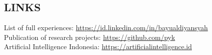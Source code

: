 \documentclass[margin, 10pt]{res} %
\begin{document}
\begin{resume}

\section{LINKS}
List of full experiences: \url{https://id.linkedin.com/in/bayualdiyansyah}\\
Publication of research projects: \url{https://github.com/pyk}\\
Artificial Intelligence Indonesia: \url{https://artificialintelligence.id}


\end{resume}
\end{document}
